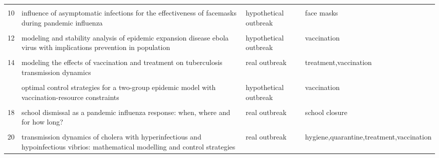 \documentclass[
]{article}
\begin{document}
\begin{landscape}
\begin{longtable}{l>{\raggedright\arraybackslash}p{3cm}l>{\raggedright\arraybackslash}p{8cm}}
\cellcolor{gray!6}{9} & \cellcolor{gray!6}{incorporating media data into a model of infectious disease transmission} & \cellcolor{gray!6}{real outbreak} & \cellcolor{gray!6}{media campaign}\\
10 & influence of asymptomatic infections for the effectiveness of facemasks during pandemic influenza & hypothetical outbreak & face masks\\
\addlinespace
\cellcolor{gray!6}{11} & \cellcolor{gray!6}{mathematical analysis of a cholera infection model with vaccination strategy} & \cellcolor{gray!6}{hypothetical outbreak} & \cellcolor{gray!6}{vaccination}\\
12 & modeling and stability analysis of epidemic expansion disease ebola virus with implications prevention in population & hypothetical outbreak & vaccination\\
\cellcolor{gray!6}{13} & \cellcolor{gray!6}{modeling the effectiveness of respiratory protective devices in reducing influenza outbreak} & \cellcolor{gray!6}{hypothetical outbreak} & \cellcolor{gray!6}{face masks,respiratory protective devices}\\
14 & modeling the effects of vaccination and treatment on tuberculosis transmission dynamics & real outbreak & treatment,vaccination\\
\cellcolor{gray!6}{15} & \cellcolor{gray!6}{optimal control and cost-effective analysis of the 2017 meningitis outbreak in nigeria} & \cellcolor{gray!6}{real outbreak} & \cellcolor{gray!6}{PPE other 1,vaccination}\\
\addlinespace
16 & optimal control strategies for a two-group epidemic model with vaccination-resource constraints & hypothetical outbreak & vaccination\\
\cellcolor{gray!6}{17} & \cellcolor{gray!6}{optimal media reporting intensity on mitigating spread of an emerging infectious disease} & \cellcolor{gray!6}{real outbreak} & \cellcolor{gray!6}{media campaign}\\
18 & school dismissal as a pandemic influenza response: when, where and for how long? & real outbreak & school closure\\
\cellcolor{gray!6}{19} & \cellcolor{gray!6}{study on modeling simulation and optimal control method for the transmission risk of the ebola virus} & \cellcolor{gray!6}{hypothetical outbreak} & \cellcolor{gray!6}{isolation,quarantine,treatment}\\
20 & transmission dynamics of cholera with hyperinfectious and hypoinfectious vibrios: mathematical modelling and control strategies & real outbreak & hygiene,quarantine,treatment,vaccination\\

\end{longtable}
\end{landscape}
\end{document}
